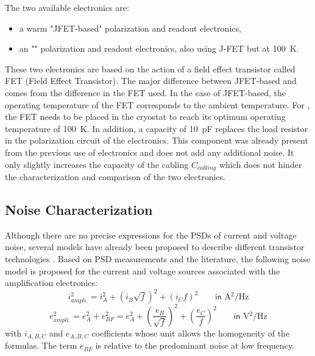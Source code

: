The two available electronics are:
\begin{itemize}
\item a warm "JFET-based" polarization and readout electronics,
\item an "\Edelweiss{}" polarization and readout electronics, also using J-FET but at \SI{100}{\kelvin}.
\end{itemize}
These two electronics are based on the action of a field effect transistor called FET (Field Effect Transistor). The major difference between JFET-based and \Edelweiss{} comes from the difference in the FET used. In the case of JFET-based, the operating temperature of the FET corresponds to the ambient temperature. For \Edelweiss{}, the FET needs to be placed in the cryostat to reach its optimum operating temperature of \SI{100}{\kelvin}. In addition, a capacity of \SI{10}{\pico\farad} replaces the load resistor in the polarization circuit of the \Edelweiss{} electronics. This component was already present from the previous use of \Edelweiss{} electronics and does not add any additional noise. It only slightly increases the capacity of the cabling  $C_{cabling}$ which does not hinder the characterization and comparison of the two electronics.


\subsection{Noise Characterization}

Although there are no precise expressions for the PSDs of current and voltage noise, several models have already been proposed to describe different transistor technologies \cite{Motchenbacher:1993low} \cite{Juillard:1999}.
Based on PSD measurements and the literature, the following noise model is proposed for the current and voltage sources associated with the amplification electronics:
\begin{equation}
\label{eq:i-amplifier}
i_{ampli.}^2 = i_A^2 + (i_B \sqrt{f})^2 + (i_C f)^2 \qquad \textsf{in } \si{\ampere^2\per\Hz}
\end{equation}
\begin{equation}
\label{eq:e-amplifier}
e_{ampli.}^2 = e_A^2 + e_{BF}^2 = e_A^2 + \left( \frac{e_B}{\sqrt{f}} \right)^2 +\left( \frac{e_C}{f} \right)^2 \qquad \textsf{in } \si{\volt^2\per\Hz}
\end{equation}
with $i_{A,B,C}$ and $e_{A,B,C}$ coefficients whose unit allows the homogeneity of the formulas. The term $e_{BF}$ is relative to the predominant noise at low frequency.


